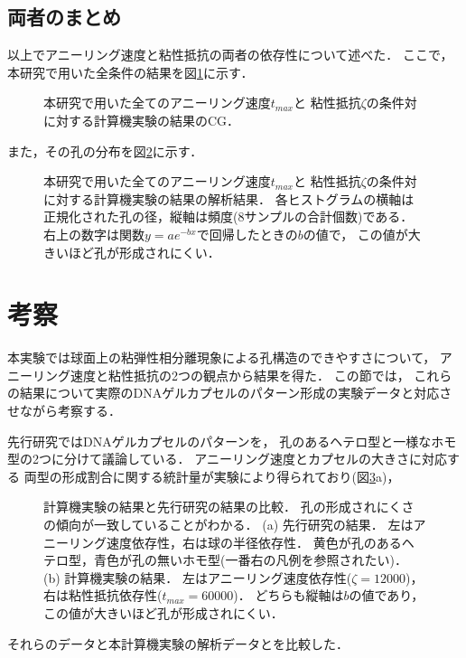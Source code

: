 \subsection{両者のまとめ}
以上でアニーリング速度と粘性抵抗の両者の依存性について述べた．
ここで，本研究で用いた全条件の結果を図\ref{fig:result_sphere_all}に示す．
\begin{figure}
    \centering
    
    \caption{
        本研究で用いた全てのアニーリング速度$t_{max}$と
        粘性抵抗$\zeta$の条件対に対する計算機実験の結果のCG．
    }
\label{fig:result_sphere_all}
\end{figure}
また，その孔の分布を図\ref{fig:result_sphere_all_hist}に示す．
\begin{figure}
    \centering
    
    \caption{
        本研究で用いた全てのアニーリング速度$t_{max}$と
        粘性抵抗$\zeta$の条件対に対する計算機実験の結果の解析結果．
        各ヒストグラムの横軸は正規化された孔の径，縦軸は頻度(8サンプルの合計個数)である．
        右上の数字は関数$y=ae^{-bx}$で回帰したときの$b$の値で，
        この値が大きいほど孔が形成されにくい．
    }
    \label{fig:result_sphere_all_hist}
\end{figure}


\section{考察}
本実験では球面上の粘弾性相分離現象による孔構造のできやすさについて，
アニーリング速度と粘性抵抗の2つの観点から結果を得た．
この節では，
これらの結果について実際のDNAゲルカプセルのパターン形成の実験データと対応させながら考察する．

先行研究ではDNAゲルカプセルのパターンを，
孔のあるヘテロ型と一様なホモ型の2つに分けて議論している．
アニーリング速度とカプセルの大きさに対応する
両型の形成割合に関する統計量が実験により得られており(図\ref{fig:result_moritasan}a)，
\begin{figure}
    \centering
    
    \caption{
        計算機実験の結果と先行研究の結果の比較．
        孔の形成されにくさの傾向が一致していることがわかる．
        (a) 先行研究の結果．
            左はアニーリング速度依存性，右は球の半径依存性．
            黄色が孔のあるヘテロ型，青色が孔の無いホモ型(一番右の凡例を参照されたい)．
        (b) 計算機実験の結果．
            左はアニーリング速度依存性($\zeta=12000$)，右は粘性抵抗依存性($t_{max}=60000$)．
            どちらも縦軸は$b$の値であり，この値が大きいほど孔が形成されにくい．
    }
    \label{fig:result_moritasan}
\end{figure}
それらのデータと本計算機実験の解析データとを比較した．


